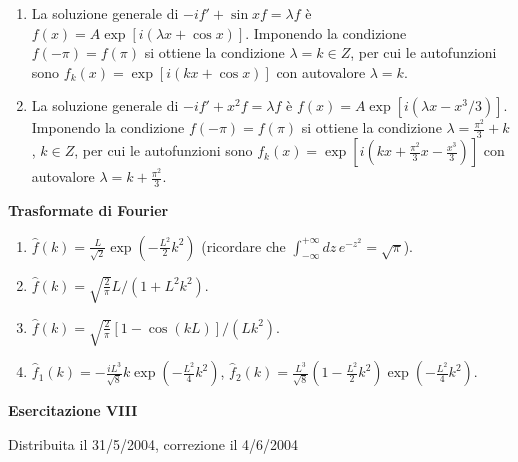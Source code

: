\documentclass[a4paper,10pt]{article}
\begin{document}
\begin{enumerate}
\item La soluzione generale di $-i f' + \sin x f = \lambda f$ \`e
$f(x) = A \exp [ i (\lambda x + \cos x)]$. Imponendo la condizione 
$f(-\pi)=f(\pi)$ si ottiene la condizione $\lambda = k \in Z$, per cui
le autofunzioni sono $f_k(x) = \exp [ i (k x + \cos x)]$ con autovalore
$\lambda=k$.
\item La soluzione generale di $-i f' + x^2 f = \lambda f$ \`e
$f(x) = A \exp [ i (\lambda x - x^3/3)]$. Imponendo la condizione 
$f(-\pi)=f(\pi)$ si ottiene la condizione $\lambda = \frac{\pi^2}{3} + k$,
$k \in Z$, per cui le autofunzioni sono 
$f_k(x) = \exp \left[ i \left(k x + \frac{\pi^2}{3} x -
\frac{x^3}{3}\right)\right]$ con autovalore
$\lambda=k + \frac{\pi^2}{3}$.
\end{enumerate}
\centerline{\large \bf Trasformate di Fourier}
\vskip10pt
\begin{enumerate}
\item $\hat{f}(k)=\frac{L}{\sqrt{2}}\exp(-\frac{L^2}{2}k^2)$ (ricordare che $\int_{-\infty}^{+\infty} dz\,e^{-z^2}=\sqrt{\pi}$).
\item $\hat{f}(k)=\sqrt{\frac{2}{\pi}} L/(1+L^2 k^2)$.
\item $\hat{f}(k)=\sqrt{\frac{2}{\pi}} [1-\cos(kL)]/(Lk^2)$.
\item $\hat{f}_1(k)=-\frac{iL^3}{\sqrt{8}} k \exp(-\frac{L^2}{4} k^2)$, $\hat{f}_2(k)=\frac{L^3}{\sqrt{8}} (1-\frac{L^2}{2} k^2) \exp(-\frac{L^2}{4} k^2)$.
\end{enumerate}

\newpage


\centerline{\LARGE \bf Esercitazione VIII}
\centerline{Distribuita il 31/5/2004, correzione il 4/6/2004}
\vskip10pt
\end{document}

